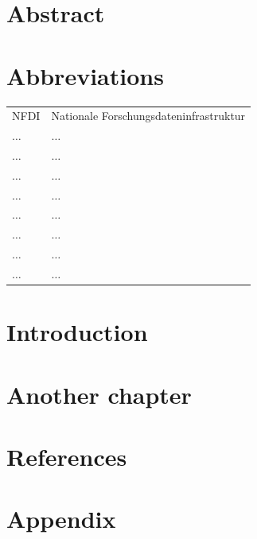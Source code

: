 \documentclass[headsepline,titlepage,twoside,12pt]{scrreprt}
\begin{document}
\chapter*{Abstract}\label{ch:abstract}

\chapter*{Abbreviations}
\begin{tabularx}{\textwidth}{lX}
NFDI					&Nationale Forschungsdateninfrastruktur\\
$\ldots$				&$\ldots$\\
$\ldots$				&$\ldots$\\
$\ldots$				&$\ldots$\\
$\ldots$				&$\ldots$\\
$\ldots$				&$\ldots$\\
$\ldots$				&$\ldots$\\
$\ldots$				&$\ldots$\\
$\ldots$				&$\ldots$\\
\end{tabularx}

\tableofcontents

\chapter{Introduction}\label{ch:introduction}

\chapter{Another chapter}\label{ch:anotherchapter}


\chapter{References}\label{ch:references}



\chapter{Appendix}\label{ch:appendix}
\end{document}
